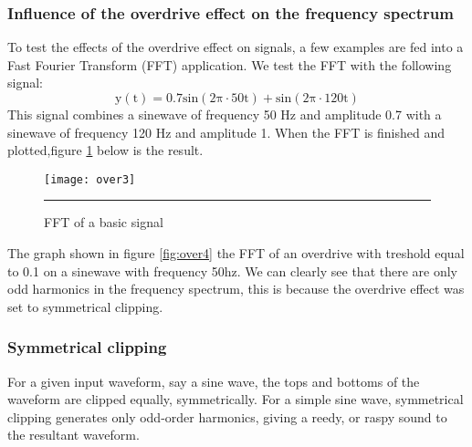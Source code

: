 \subsubsection{Influence of the overdrive effect on the frequency spectrum}
To test the effects of the overdrive effect on signals, a few examples are fed into a Fast Fourier Transform (FFT) application. We test the FFT with the following signal: 
\begin{equation}
\mathrm{y(t) = 0.7 sin(2\pi \cdot 50t) + sin(2\pi \cdot 120t)}
\end{equation}
This signal combines a sinewave of frequency 50 Hz and amplitude 0.7 with a sinewave of frequency 120 Hz and amplitude 1. When the FFT is finished and plotted,figure \ref{fig:over3} below is the result.
\begin{figure}[htbp]
\centering
\texttt{[image: over3]}
\rule{30em}{0.5pt}
\caption{FFT of a basic signal}
\label{fig:over3}
\end{figure}
The graph shown in figure \ref{fig:over4} the FFT of an overdrive with treshold equal to 0.1 on a sinewave with frequency 50hz. We can clearly see that there are only odd harmonics in the frequency spectrum, this is because the overdrive effect was set to symmetrical clipping.
\subsubsection{Symmetrical clipping}
For a given input waveform, say a sine wave, the tops and bottoms of the waveform are clipped equally, symmetrically. For a simple sine wave, symmetrical clipping generates only odd-order harmonics, giving a reedy, or raspy sound to the resultant waveform. 
